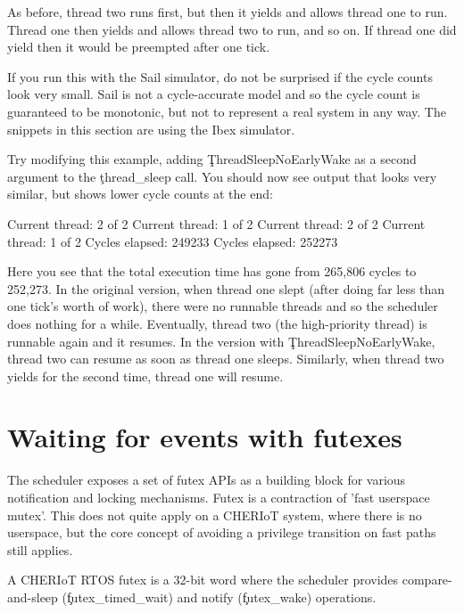 As before, thread two runs first, but then it yields and allows thread one to run.
Thread one then yields and allows thread two to run, and so on.
If thread one did  yield then it would be preempted after one tick.

\begin{note}
If you run this with the Sail simulator, do not be surprised if the cycle counts look very small.
Sail is not a cycle-accurate model and so the cycle count is guaranteed to be monotonic, but not to represent a real system in any way.
The snippets in this section are using the Ibex simulator.
\end{note}

Try modifying this example, adding \c{ThreadSleepNoEarlyWake}  as a second argument to the \c{thread_sleep} call.
You should now see output that looks very similar, but shows lower cycle counts at the end:

\begin{console}
Current thread: 2 of 2
Current thread: 1 of 2
Current thread: 2 of 2
Current thread: 1 of 2
Cycles elapsed: 249233
Cycles elapsed: 252273
\end{console}

Here you see that the total execution time has gone from 265,806 cycles to 252,273.
In the original version, when thread one slept (after doing far less than one tick's worth of work), there were no runnable threads and so the scheduler does nothing for a while.
Eventually, thread two (the high-priority thread) is runnable again and it resumes.
In the version with \c{ThreadSleepNoEarlyWake}, thread two can resume as soon as thread one sleeps.
Similarly, when thread two yields for the second time, thread one will resume.

\section[label=futex]{Waiting for events with futexes}

The scheduler exposes a set of futex APIs as a building block for various notification and locking mechanisms.
Futex is a contraction of 'fast userspace mutex'.
This does not quite apply on a CHERIoT system, where there is no userspace, but the core concept of avoiding a privilege transition on fast paths still applies.

A CHERIoT RTOS futex is a 32-bit word where the scheduler provides compare-and-sleep (\c{futex_timed_wait}) and notify (\c{futex_wake}) operations.

